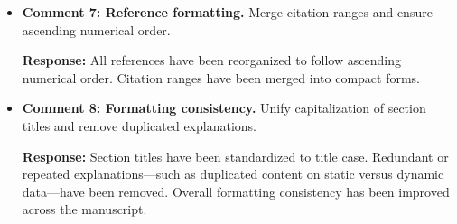\documentclass[3p]{elsarticle}
\theoremstyle{remark}
\begin{document}
\begin{itemize}
    \textbf{Response:}  
    A dedicated clarification has been added to Section~6.  
    We now explicitly state that verifier identities remain unlinkable across different tasks because  each participation uses a fresh commitment and nullifier, preventing cross-task linkage.  This emphasizes the strong anonymity guarantees of the protocol.

    \item \textbf{Comment 7: Reference formatting.}  
    Merge citation ranges and ensure ascending numerical order.

    \textbf{Response:}  
    All references have been reorganized to follow ascending numerical order.  
    Citation ranges have been merged into compact forms.  

    \item \textbf{Comment 8: Formatting consistency.}  
    Unify capitalization of section titles and remove duplicated explanations.

    \textbf{Response:}  
    Section titles have been standardized to title case.  
    Redundant or repeated explanations—such as duplicated content on static versus dynamic data—have been removed.  
    Overall formatting consistency has been improved across the manuscript.

\end{itemize}
\end{document}
